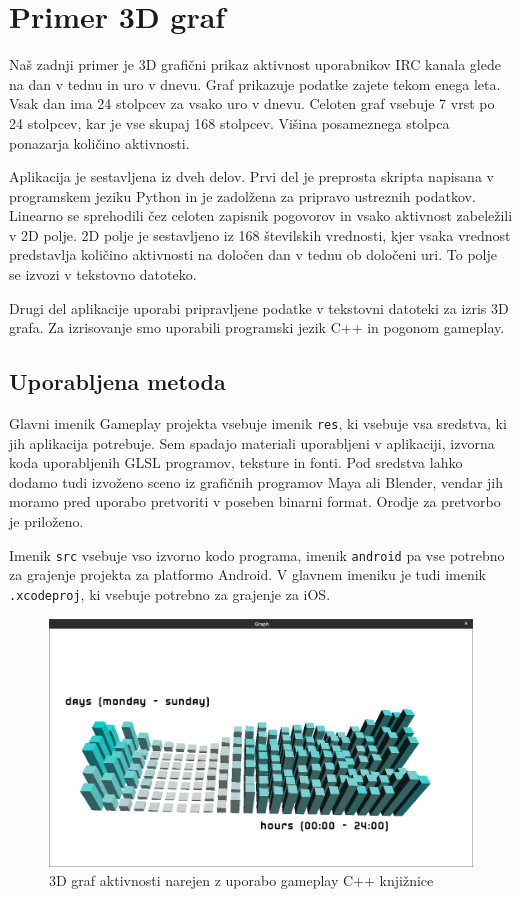 \section{Primer 3D graf}

Naš zadnji primer je 3D grafični prikaz aktivnost uporabnikov IRC kanala glede na dan v tednu in uro v dnevu. Graf prikazuje podatke zajete tekom enega leta. Vsak dan ima 24 stolpcev za vsako uro v dnevu. Celoten graf vsebuje 7 vrst po 24 stolpcev, kar je vse skupaj 168 stolpcev. Višina posameznega stolpca ponazarja količino aktivnosti.

Aplikacija je sestavljena iz dveh delov. Prvi del je preprosta skripta napisana v programskem jeziku Python in je zadolžena za pripravo ustreznih podatkov. Linearno se sprehodili čez celoten zapisnik pogovorov in vsako aktivnost zabeležili v 2D polje. 2D polje je sestavljeno iz 168 številskih vrednosti, kjer vsaka vrednost predstavlja količino aktivnosti na določen dan v tednu ob določeni uri. To polje se izvozi v tekstovno datoteko.

Drugi del aplikacije uporabi pripravljene podatke v tekstovni datoteki za izris 3D grafa. Za izrisovanje smo uporabili programski jezik C++ in pogonom gameplay. 

\subsection{Uporabljena metoda}

Glavni imenik Gameplay projekta vsebuje imenik \texttt{res}, ki vsebuje vsa sredstva, ki jih aplikacija potrebuje. Sem spadajo materiali uporabljeni v aplikaciji, izvorna koda uporabljenih GLSL programov, teksture in fonti. Pod sredstva lahko dodamo tudi izvoženo sceno iz grafičnih programov Maya ali Blender, vendar jih moramo pred uporabo pretvoriti v poseben binarni format. Orodje za pretvorbo je priloženo.

Imenik \texttt{src} vsebuje vso izvorno kodo programa, imenik \texttt{android} pa vse potrebno za grajenje projekta za platformo Android. V glavnem imeniku je tudi imenik \texttt{.xcodeproj}, ki vsebuje potrebno za grajenje za iOS.

\begin{figure}
\begin{center}
\includegraphics[width=12cm]{pic/cpp.png}
\end{center}
\caption{3D graf aktivnosti narejen z uporabo gameplay C++ knjižnice}
\label{minchrome}
\end{figure}

